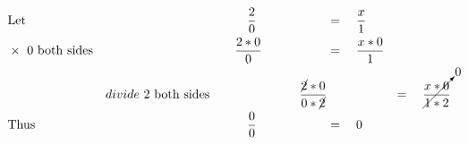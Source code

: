 \begin{alignat*}{3}
&\mathrm{Let}&&\qquad\quad\frac{2}{0}&&=\quad\frac{x}{1}\\
&\times\mathrm{~0~both~sides}&&\qquad\frac{2*0}{0}&&=\quad\frac{x*0}{1}\\
&\,\,&divide\mathrm{~2~both~sides}&&\qquad\frac{\cancel{2}*0}{0*\cancel{2}}&&=\quad\cancelto{0}{\frac{x*0}{1*2}}\\
&\mathrm{Thus}&&\qquad\quad\frac{0}{0}&&=\quad0
\end{alignat*}
